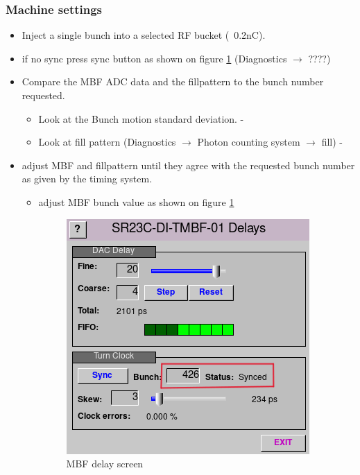\documentclass{report}
\begin{document}
\subsubsection{Machine settings}
\begin{itemize}
    \item {Inject a single bunch into a selected RF bucket (~0.2nC).}
     \item{if no sync press sync button as shown on figure \ref{fig:MBF_delays} (Diagnostics $\rightarrow$ {\color{red}????})}
    \item{Compare the MBF ADC data and the fillpattern to the bunch number requested.}
    \begin{itemize}
        \item{Look at the Bunch motion standard deviation. - \color{red}{ADD SCREENSHOT}}
        \item{Look at fill pattern (Diagnostics $\rightarrow$ Photon counting system $\rightarrow$ fill) - \color{red}{ADD SCREENSHOT}}
    \end{itemize}
    \item{adjust MBF and fillpattern until they agree with the requested bunch number as given by the timing system.}
    \begin{itemize}
    \item{adjust MBF bunch value as shown on figure \ref{fig:MBF_delays}}
    \begin{figure}[h]
        \centering
        \includegraphics[width=0.6\linewidth]{MBF_delays.png}
        \caption{MBF delay screen}
        \label{fig:MBF_delays}
    \end{figure}
       
    \end{itemize}
\end{itemize}
\end{document}
